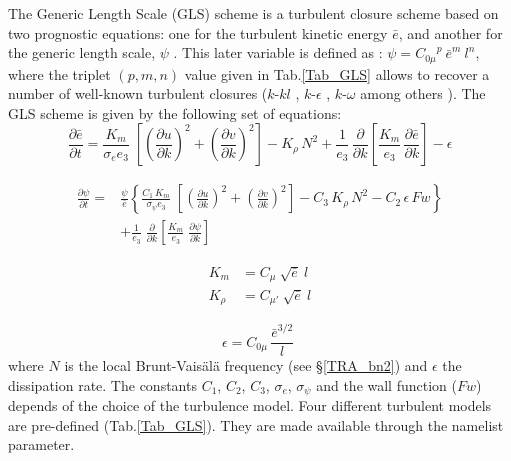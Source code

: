 The Generic Length Scale (GLS) scheme is a turbulent closure scheme based on 
two prognostic equations: one for the turbulent kinetic energy $\bar {e}$, and another 
for the generic length scale, $\psi$ \citep{Umlauf_Burchard_JMS03, Umlauf_Burchard_CSR05}. 
This later variable is defined as : $\psi = {C_{0\mu}}^{p} \ {\bar{e}}^{m} \ l^{n}$, 
where the triplet $(p, m, n)$ value given in Tab.\ref{Tab_GLS} allows to recover 
a number of well-known turbulent closures ($k$-$kl$ \citep{Mellor_Yamada_1982}, 
$k$-$\epsilon$ \citep{Rodi_1987}, $k$-$\omega$ \citep{Wilcox_1988} 
among others \citep{Umlauf_Burchard_JMS03,Kantha_Carniel_CSR05}). 
The GLS scheme is given by the following set of equations:
\begin{equation} \label{Eq_zdfgls_e}
\frac{\partial \bar{e}}{\partial t} = 
\frac{K_m}{\sigma_e e_3 }\;\left[ {\left( \frac{\partial u}{\partial k} \right)^2
                                                   +\left( \frac{\partial v}{\partial k} \right)^2} \right]
-K_\rho \,N^2
+\frac{1}{e_3}\,\frac{\partial}{\partial k} \left[ \frac{K_m}{e_3}\,\frac{\partial \bar{e}}{\partial k} \right]
- \epsilon
\end{equation}

\begin{equation} \label{Eq_zdfgls_psi}
   \begin{split}
\frac{\partial \psi}{\partial t} =& \frac{\psi}{\bar{e}} \left\{
\frac{C_1\,K_m}{\sigma_{\psi} {e_3}}\;\left[ {\left( \frac{\partial u}{\partial k} \right)^2
                                                                   +\left( \frac{\partial v}{\partial k} \right)^2} \right]
- C_3 \,K_\rho\,N^2   - C_2 \,\epsilon \,Fw   \right\}             \\
&+\frac{1}{e_3}  \;\frac{\partial }{\partial k}\left[ {\frac{K_m}{e_3 }
                                  \;\frac{\partial \psi}{\partial k}} \right]\;
   \end{split}
\end{equation}

\begin{equation} \label{Eq_zdfgls_kz}
   \begin{split}
         K_m    &= C_{\mu} \ \sqrt {\bar{e}} \ l         \\
         K_\rho &= C_{\mu'}\ \sqrt {\bar{e}} \ l
   \end{split}
\end{equation}

\begin{equation} \label{Eq_zdfgls_eps}
{\epsilon} = C_{0\mu} \,\frac{\bar {e}^{3/2}}{l} \;
\end{equation}
where $N$ is the local Brunt-Vais\"{a}l\"{a} frequency (see \S\ref{TRA_bn2}) 
and $\epsilon$ the dissipation rate. 
The constants $C_1$, $C_2$, $C_3$, ${\sigma_e}$, ${\sigma_{\psi}}$ and the wall function ($Fw$) 
depends of the choice of the turbulence model. Four different turbulent models are pre-defined 
(Tab.\ref{Tab_GLS}). They are made available through the  namelist parameter. 

